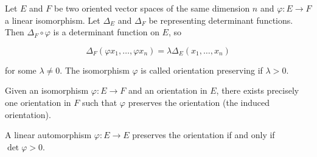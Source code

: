 Let $E$ and $F$ be two oriented vector spaces of the same dimension $n$ and $\varphi: E \to F$ a linear isomorphism. Let $\Delta_E$ and $\Delta_F$ be representing determinant functions. Then $\Delta_F \circ \varphi$ is a determinant function on $E$, so

$$\Delta_F(\varphi x_1, \ldots, \varphi x_n) = \lambda \Delta_E(x_1, \ldots, x_n)$$

for some $\lambda \neq 0$. The isomorphism $\varphi$ is called orientation preserving if $\lambda > 0$.

Given an isomorphism $\varphi: E \to F$ and an orientation in $E$, there exists precisely one orientation in $F$ such that $\varphi$ preserves the orientation (the induced orientation).

A linear automorphism $\varphi: E \to E$ preserves the orientation if and only if $\det \varphi > 0$.
